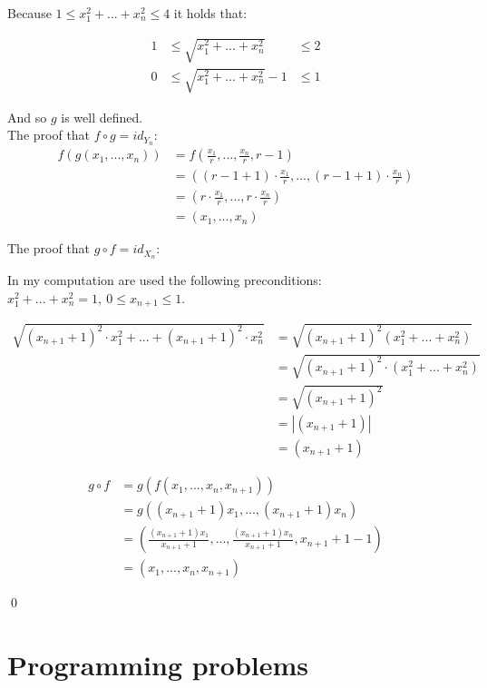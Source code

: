 \documentclass[12pt]{article}
\begin{document}
\noindent Because $1 \leq x_{1}^2 + ... + x_{n}^2 \leq 4$ it holds that: 


\begin{align*} 
1 &\leq \sqrt{x_1^2 + ... + x_n^2} &\leq 2 \\
0 &\leq \sqrt{x_1^2 + ... + x_n^2} - 1 &\leq 1
\end{align*}

\noindent And so $g$ is well defined. \\

\noindent The proof that $f \circ g = id_{Y_n}$:
\begin{align*}
	f(g(x_1,...,x_n)) &= f(\frac{x_1}{r}, ... , \frac{x_n}{r}, r-1) \\
	&= ((r-1+1) \cdot \frac{x_1}{r},...,(r-1+1) \cdot \frac{x_n}{r}) \\
	&= (r \cdot \frac{x_1}{r},..., r \cdot \frac{x_n}{r}) \\
	&= (x_1,..., x_n)
	\end{align*}

\noindent The proof that $g \circ f = id_{X_n}$:

\noindent In my computation are used the following preconditions: $x_{1}^2 + ... + x_{n}^2 = 1, \ 0 \leq x_{n+1} \leq 1$.

\begin{align*}
	\sqrt{(x_{n+1} + 1)^2 \cdot x_1 ^2+...+(x_{n+1}+1)^2 \cdot x_n^2}  & = \sqrt{(x_{n+1}+1)^2(x_1^2 + ... + x_n^2)} \\
	&= \sqrt{(x_{n+1}+1)^2 \cdot (x_1^2 + ... + x_n^2)} \\
	&= \sqrt{(x_{n+1}+1)^2 } \\
	&= |(x_{n+1}+1)| \\
	&= (x_{n+1}+1)
\end{align*}


\begin{align*}
	g \circ f &= g(f(x_1,...,x_n,x_{n+1})) \\
	&= g((x_{n+1}+1)x_1,...,(x_{n+1}+1)x_n) \\
	&= \left( \frac{(x_{n+1}+1)x_1}{x_{n+1}+1},...,\frac{(x_{n+1}+1)x_n}{x_{n+1}+1}, x_{n+1}+1-1 \right) \\
	&= (x_1, ...,x_n,x_{n+1})
\end{align*}

\qed

	\section{Programming problems}
\end{document}
